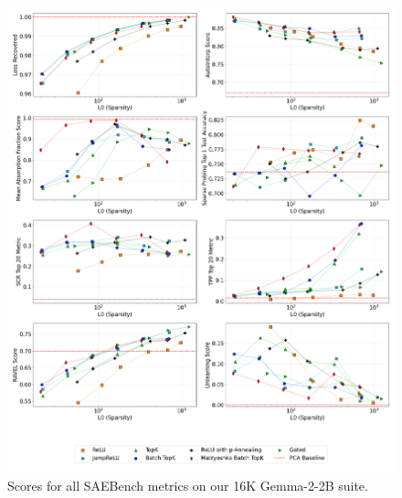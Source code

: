 \documentclass{article}
\theoremstyle{plain}
\theoremstyle{definition}
\theoremstyle{remark}
\begin{document}
\begin{figure}[h!]
    \centering
    \includegraphics[width=\columnwidth]{images/plot_2x4_sae_bench_gemma-2-2b_16k_architecture_series_layer_12.png}
    \caption{Scores for all SAEBench metrics on our 16K Gemma-2-2B suite.}
\end{figure}
\label{fig:plot_2x4_sae_bench_gemma-2-2b_16k_architecture_series_layer_12}
\end{document}
